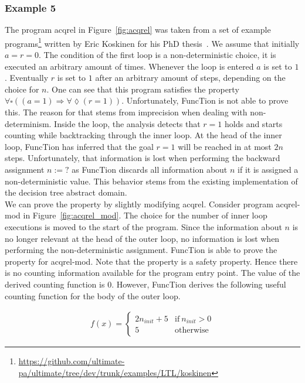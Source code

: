 \documentclass[11pt,a4paper,titlepage]{article}
\theoremstyle{definition}
\begin{document}
\subsubsection*{Example 5}

The program \textsf{acqrel} in Figure~\ref{fig:acqrel} was taken from a set of example 
programs\footnote{\url{https://github.com/ultimate-pa/ultimate/tree/dev/trunk/examples/LTL/koskinen}} 
written by Eric Koskinen for his PhD thesis~\cite{KoskinenPhd}. We assume that initially $a = r = 0$.
The condition of the first loop is a non-deterministic choice, it is executed an arbitrary amount of times. 
Whenever the loop is entered $a$ is set to $1$. Eventually $r$ is set to $1$ after an arbitrary amount of steps, 
depending on the choice for $n$. One can see that this program satisfies the property 
$\forall\square((a = 1) \Rightarrow \forall\lozenge(r = 1))$. Unfortunately, FuncTion is not able to prove this.
The reason for that stems from imprecision when dealing with non-determinism. Inside the loop, the analysis detects that 
$r = 1$ holds and starts counting while backtracking through the inner loop. At the head of the inner loop,
FuncTion has inferred that the goal $r = 1$ will be reached in at most $2n$ steps. Unfortunately, that information is lost when 
performing the backward assignment $n := ?$ as FuncTion discards all information about $n$ if it is assigned a non-deterministic value.
This behavior stems from the existing implementation of the decision tree abstract domain.\\

We can prove the property by slightly modifying \textsf{acqrel}. Consider program \textsf{acqrel-mod} in Figure~\ref{fig:acqrel_mod}. 
The choice for the number of inner loop executions is moved to the start of the program. 
Since the information about $n$ is no longer relevant at the head of the outer loop, 
no information is lost when performing the non-deterministic assignment. FuncTion is able to prove the 
property for \textsf{acqrel-mod}. Note that the property is a safety property. 
Hence there is no counting information available for the program entry point. 
The value of the derived counting function is $0$.
However, FuncTion derives the following useful counting function for the body of the outer loop.

\begin{align*}
f(x) = \begin{cases}
    2n_{init} + 5  & \text{if} \ n_{init} > 0 \\
    5  & \text{otherwise}
\end{cases}
\end{align*}
\end{document}
